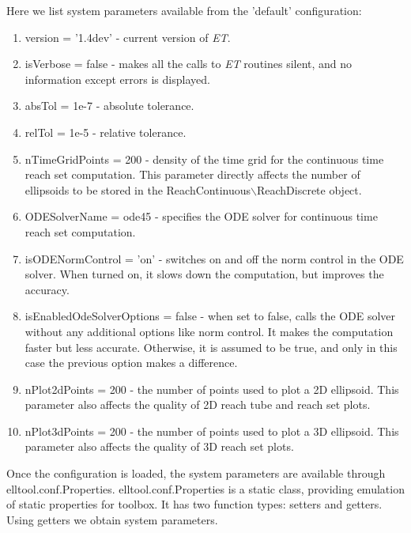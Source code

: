 \documentclass[letterpaper,10pt,english]{sphinxmanual}
\begin{document}
Here we list system parameters available from the ’default’
configuration:
\begin{enumerate}
\item {} 
version = ’1.4dev’ - current version of \emph{ET}.

\item {} 
isVerbose = false - makes all the calls to \emph{ET} routines silent, and
no information except errors is displayed.

\item {} 
absTol = 1e-7 - absolute tolerance.

\item {} 
relTol = 1e-5 - relative tolerance.

\item {} 
nTimeGridPoints = 200 - density of the time grid for the continuous
time reach set computation. This parameter directly affects the
number of ellipsoids to be stored in the
ReachContinuous$\backslash$ReachDiscrete object.

\item {} 
ODESolverName = ode45 - specifies the ODE solver for continuous time
reach set computation.

\item {} 
isODENormControl = ’on’ - switches on and off the norm control in the
ODE solver. When turned on, it slows down the computation, but
improves the accuracy.

\item {} 
isEnabledOdeSolverOptions = false - when set to false, calls the ODE
solver without any additional options like norm control. It makes the
computation faster but less accurate. Otherwise, it is assumed to be
true, and only in this case the previous option makes a difference.

\item {} 
nPlot2dPoints = 200 - the number of points used to plot a 2D
ellipsoid. This parameter also affects the quality of 2D reach tube
and reach set plots.

\item {} 
nPlot3dPoints = 200 - the number of points used to plot a 3D
ellipsoid. This parameter also affects the quality of 3D reach set
plots.

\end{enumerate}

Once the configuration is loaded, the system parameters are available
through elltool.conf.Properties. elltool.conf.Properties is a static
class, providing emulation of static properties for toolbox. It has two
function types: setters and getters. Using getters we obtain system
parameters.
\end{document}
